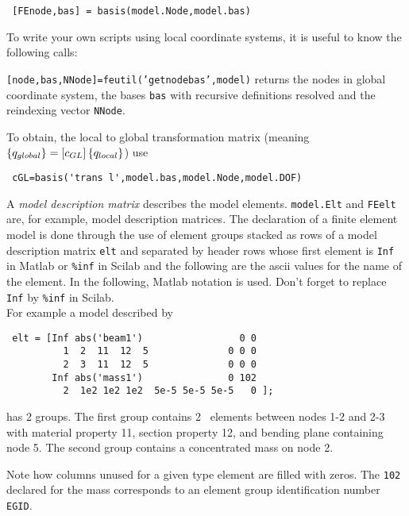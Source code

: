 \begin{verbatim}
 [FEnode,bas] = basis(model.Node,model.bas)
\end{verbatim}

To write your own scripts using local coordinate systems, it is useful to know the following calls:

{\tt [node,bas,NNode]=feutil('getnodebas',model)} returns the nodes in global coordinate system, the bases {\tt bas} with recursive definitions resolved and the reindexing vector {\tt NNode}. 

To obtain, the local to global transformation matrix (meaning $\left\{q_{global}\right\} = \left[c_{GL}\right] \left\{q_{local}\right\}$) use
\begin{verbatim}
 cGL=basis('trans l',model.bas,model.Node,model.DOF)
\end{verbatim}


%

\noindent A {\sl model description matrix} describes the model elements. {\tt model.Elt} and {\tt FEelt} are, for example, model description matrices. The declaration of a finite element model is done through the use of element groups stacked as rows of a model description matrix {\tt elt} and separated by header rows whose first element is {\tt Inf} in Matlab or {\tt \%inf} in Scilab and the following are the {\sc ascii} values for the name of the element. In the following, Matlab notation is used. Don't forget to replace {\tt Inf} by {\tt \%inf} in Scilab. \\
For example a model described by 

\begin{verbatim}
 elt = [Inf abs('beam1')                 0 0
          1  2  11  12  5              0 0 0
          2  3  11  12  5              0 0 0
        Inf abs('mass1')               0 102
          2  1e2 1e2 1e2  5e-5 5e-5 5e-5   0 ];
\end{verbatim}

\noindent has 2 groups. The first group contains 2 \beam\ elements between nodes 1-2 and 2-3 with material property 11, section property 12, and bending plane containing node 5. The second group contains a concentrated mass on node 2.

Note how columns unused for a given type element are filled with zeros. The {\tt 102} declared for the mass corresponds to an element group identification number {\tt EGID}. 

